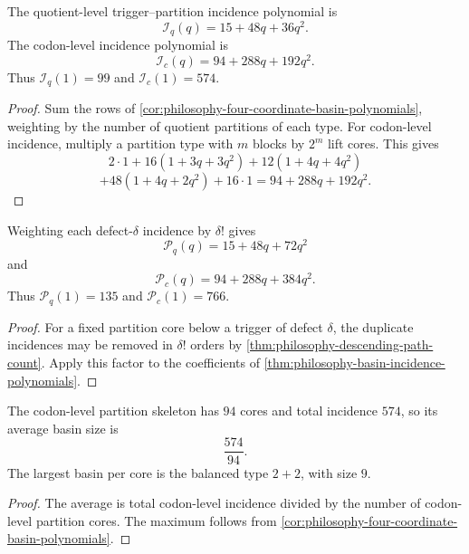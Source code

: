 \begin{theorem}
\label{thm:philosophy-basin-incidence-polynomials}
The quotient-level trigger--partition incidence polynomial is
$$
  \mathcal{I}_{q}(q)
  =
  15+48q+36q^{2}.
$$
The codon-level incidence polynomial is
$$
  \mathcal{I}_{c}(q)
  =
  94+288q+192q^{2}.
$$
Thus $\mathcal{I}_{q}(1)=99$ and $\mathcal{I}_{c}(1)=574$.
\end{theorem}
\begin{proof}
Sum the rows of
\autoref{cor:philosophy-four-coordinate-basin-polynomials}, weighting
by the number of quotient partitions of each type. For codon-level
incidence, multiply a partition type with $m$ blocks by $2^{m}$ lift
cores. This gives
$$
  2\cdot1
  +
  16(1+3q+3q^{2})
  +
  12(1+4q+4q^{2})
$$
$$
  +
  48(1+4q+2q^{2})
  +
  16\cdot1
  =
  94+288q+192q^{2}.
$$
\end{proof}

\begin{theorem}
\label{thm:philosophy-descending-path-polynomials}
Weighting each defect-$\delta$ incidence by $\delta!$ gives
$$
  \mathcal{P}_{q}(q)
  =
  15+48q+72q^{2}
$$
and
$$
  \mathcal{P}_{c}(q)
  =
  94+288q+384q^{2}.
$$
Thus $\mathcal{P}_{q}(1)=135$ and $\mathcal{P}_{c}(1)=766$.
\end{theorem}
\begin{proof}
For a fixed partition core below a trigger of defect $\delta$, the
duplicate incidences may be removed in $\delta!$ orders by
\autoref{thm:philosophy-descending-path-count}. Apply this factor to
the coefficients of
\autoref{thm:philosophy-basin-incidence-polynomials}.
\end{proof}

\begin{corollary}
\label{cor:philosophy-basin-size-averages}
The codon-level partition skeleton has $94$ cores and total incidence
$574$, so its average basin size is
$$
  \frac{574}{94}.
$$
The largest basin per core is the balanced type $2+2$, with size $9$.
\end{corollary}
\begin{proof}
The average is total codon-level incidence divided by the number of
codon-level partition cores. The maximum follows from
\autoref{cor:philosophy-four-coordinate-basin-polynomials}.
\end{proof}

